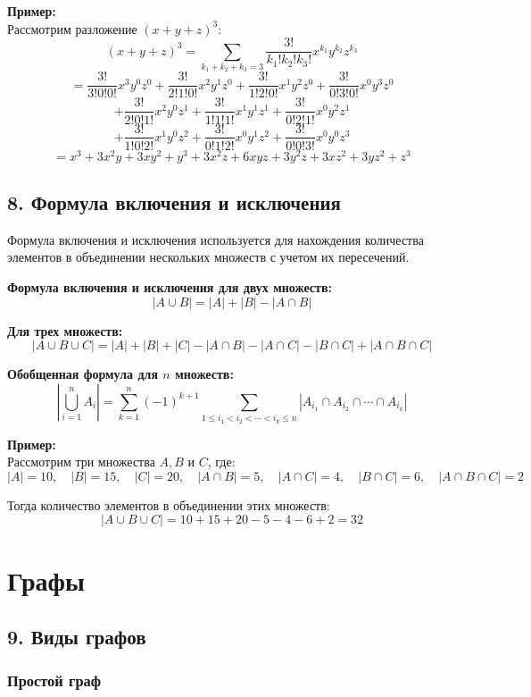\documentclass{article}
\begin{document}
\textbf{Пример:} \\
Рассмотрим разложение \((x + y + z)^3\):
\[
(x + y + z)^3 = \sum_{k_1 + k_2 + k_3 = 3} \frac{3!}{k_1! k_2! k_3!} x^{k_1} y^{k_2} z^{k_3}
\]
\[
= \frac{3!}{3! 0! 0!} x^3 y^0 z^0 + \frac{3!}{2! 1! 0!} x^2 y^1 z^0 + \frac{3!}{1! 2! 0!} x^1 y^2 z^0 + \frac{3!}{0! 3! 0!} x^0 y^3 z^0 
\]
\[
+ \frac{3!}{2! 0! 1!} x^2 y^0 z^1 + \frac{3!}{1! 1! 1!} x^1 y^1 z^1 + \frac{3!}{0! 2! 1!} x^0 y^2 z^1 
\]
\[
+ \frac{3!}{1! 0! 2!} x^1 y^0 z^2 + \frac{3!}{0! 1! 2!} x^0 y^1 z^2 + \frac{3!}{0! 0! 3!} x^0 y^0 z^3
\]
\[
= x^3 + 3x^2 y + 3x y^2 + y^3 + 3x^2 z + 6xy z + 3y^2 z + 3xz^2 + 3y z^2 + z^3
\]
\pagebreak

\subsection*{8. Формула включения и исключения}

Формула включения и исключения используется для нахождения количества элементов в объединении нескольких множеств с учетом их пересечений.

\textbf{Формула включения и исключения для двух множеств:}
\[
|A \cup B| = |A| + |B| - |A \cap B|
\]

\textbf{Для трех множеств:}
\[
|A \cup B \cup C| = |A| + |B| + |C| - |A \cap B| - |A \cap C| - |B \cap C| + |A \cap B \cap C|
\]

\textbf{Обобщенная формула для \( n \) множеств:}
\[
\left| \bigcup_{i=1}^{n} A_i \right| = \sum_{k=1}^{n} (-1)^{k+1} \sum_{1 \leq i_1 < i_2 < \cdots < i_k \leq n} \left| A_{i_1} \cap A_{i_2} \cap \cdots \cap A_{i_k} \right|
\]

\textbf{Пример:} \\
Рассмотрим три множества \( A, B \) и \( C \), где:
\[
|A| = 10, \quad |B| = 15, \quad |C| = 20, \quad |A \cap B| = 5, \quad |A \cap C| = 4, \quad |B \cap C| = 6, \quad |A \cap B \cap C| = 2
\]

Тогда количество элементов в объединении этих множеств:
\[
|A \cup B \cup C| = 10 + 15 + 20 - 5 - 4 - 6 + 2 = 32
\]
\pagebreak


\section*{Графы}  
\subsection*{9. Виды графов}
\subsubsection*{Простой граф}
\end{document}
